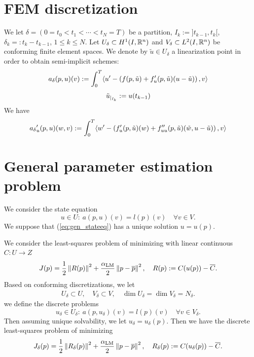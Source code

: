 \documentclass[english,12pt,a4paper]{article}
\newcommand{\alphaLM}{\alpha_{\rm LM}}
\begin{document}
\section{FEM discretization}\label{sec:}
%
We let $\delta=(0=t_0<t_1<\cdots < t_N=T)$ be a partition, $I_k:=]t_{k-1},t_k[$, $\delta_k=:t_k-t_{k-1}$, $1\le k\le N$.
Let $U_{\delta}\subset H^1(I,\mathbb R^n)$ and $V_{\delta}\subset L^2(I,\mathbb R^n)$ be conforming finite element spaces. We denote by $\tilde u\in U_{\delta}$ a linearization point in order to obtain semi-implicit schemes:
%
\begin{equation}\label{eq:}
a_{\delta}(p,u)(v) := \int_0^T \langle u' - \left( f(p,\tilde u) + f'_u(p,\tilde u)(u-\tilde u)\right),v\rangle
\end{equation}
%
%
\begin{equation}\label{eq:}
{\tilde u}_{|_{I_k}} := u(t_{k-1})
\end{equation}
%
We have
%
\begin{equation}\label{eq:}
{a_{\delta}}_u'(p,u)(w, v) := \int_0^T \langle w' - \left( f'_u(p,\tilde u)( w) + f''_{uu}(p,\tilde u)(\tilde w,u-\tilde u)\right),v\rangle
\end{equation}
%
%
\section{General parameter estimation problem}\label{sec:}
%
We consider the state equation
%
\begin{equation}\label{eq:gen_stateeq}
u\in U:\: a(p,u)(v) = l(p)(v)\quad \forall v\in V.
\end{equation}
%
We suppose that (\ref{eq:gen_stateeq}) has a unique solution $u = u(p)$. 

We consider the least-squares problem of minimizing with linear continuous $C:U\to Z$
%
\begin{equation}\label{eq:gen_ls}
J(p) = \frac12 \norm{R(p)}^2 + \frac{\alphaLM}{2}\norm{p-\overline{p}}^2,\quad R(p) := C(u(p))-\overline{C}.
\end{equation}
%
Based on conforming discretizations, we let
%
\begin{align*}
U_{\delta}\subset U,\quad V_{\delta}\subset V,\quad \dim U_{\delta} = \dim V_{\delta} = N_{\delta}.
\end{align*}
%
we define the discrete problems
%
\begin{equation}\label{eq:gen_stateeq_delta}
u_{\delta}\in U_{\delta}:\: a(p,u_{\delta})(v) = l(p)(v)\quad \forall v\in V_{\delta}.
\end{equation}
%
Then assuming unique solvability, we let $u_{\delta}=u_{\delta}(p)$. Then we have the discrete least-squares problem of minimizing
%
\begin{equation}\label{eq:gen_ls_delta}
J_{\delta}(p) = \frac12 \norm{R_{\delta}(p)}^2 + \frac{\alphaLM}{2}\norm{p-\overline{p}}^2,\quad R_{\delta}(p) := C(u_{\delta}(p))-\overline{C}.
\end{equation}
%
\end{document}
